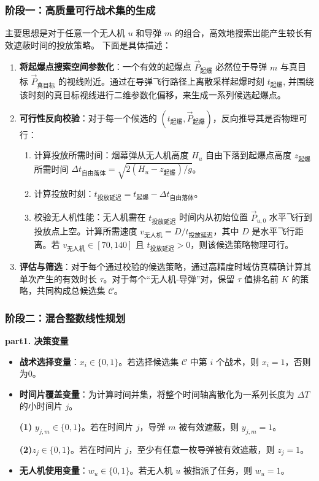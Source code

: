 \documentclass[5pt, withoutpreface,bwprint]{cumcmthesis} %
\begin{document}
\subsubsection{阶段一：高质量可行战术集的生成}
主要思想是对于任意一个无人机 $u$ 和导弹 $m$ 的组合，高效地搜索出能产生较长有效遮蔽时间的投放策略。
下面是具体描述：
\begin{enumerate}
    \item \textbf{将起爆点搜索空间参数化}：一个有效的起爆点 $\vec{P}_{\text{起爆}}$ 必然位于导弹 $m$ 与真目标 $\vec{P}_{\text{真目标}}$ 的视线附近。通过在导弹飞行路径上离散采样起爆时刻 $t_{\text{起爆}}$, 并围绕该时刻的真目标视线进行二维参数化偏移，来生成一系列候选起爆点。
    \item \textbf{可行性反向校验}：对于每一个候选的 $(t_{\text{起爆}}, \vec{P}_{\text{起爆}})$，反向推导其是否物理可行：
        \begin{enumerate}
            \item 计算投放所需时间：烟幕弹从无人机高度 $H_u$ 自由下落到起爆点高度 $z_{\text{起爆}}$ 所需时间 $\Delta t_{\text{自由落体}} = \sqrt{2(H_u - z_{\text{起爆}})/g}$。
            \item 计算投放时刻：$t_{\text{投放延迟}} = t_{\text{起爆}} - \Delta t_{\text{自由落体}}$。
            \item 校验无人机性能：无人机需在 $t_{\text{投放延迟}}$ 时间内从初始位置 $\vec{P}_{u,0}$ 水平飞行到投放点上空。计算所需速度 $v_{\text{无人机}} = D / t_{\text{投放延迟}}$，其中 $D$ 是水平飞行距离。若 $v_{\text{无人机}} \in [70, 140]$ 且 $t_{\text{投放延迟}} > 0$，则该候选策略物理可行。
        \end{enumerate}
    \item \textbf{评估与筛选}：对于每个通过校验的候选策略，通过高精度时域仿真精确计算其单次产生的有效时长 $\tau$。对于每个“无人机-导弹”对，保留 $\tau$ 值排名前 $K$ 的策略，共同构成总候选集 $\mathcal{C}$。
\end{enumerate}

\subsubsection{阶段二：混合整数线性规划}

\textbf{part1. 决策变量}
\begin{itemize}
    \item \textbf{战术选择变量}：$x_i \in \{0, 1\}$。若选择候选集 $\mathcal{C}$ 中第 $i$ 个战术，则 $x_i=1$，否则为0。
    \item \textbf{时间片覆盖变量}：为计算时间并集，将整个时间轴离散化为一系列长度为 $\Delta T$ 的小时间片 $j$。
    
        \textbf{(1)} $y_{j,m} \in \{0, 1\}$。若在时间片 $j$，导弹 $m$ 被有效遮蔽，则 $y_{j,m}=1$。
         
         \textbf{(2)}$z_j \in \{0, 1\}$。若在时间片 $j$，至少有任意一枚导弹被有效遮蔽，则 $z_j=1$。
        
    \item \textbf{无人机使用变量}：$w_u \in \{0, 1\}$。若无人机 $u$ 被指派了任务，则 $w_u=1$。
\end{itemize}
\end{document}
